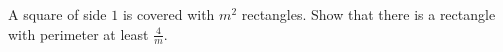 A square of side $1$ is covered with $m^2$ rectangles.
Show that there is a rectangle with perimeter at least $\frac{4}{m}$.